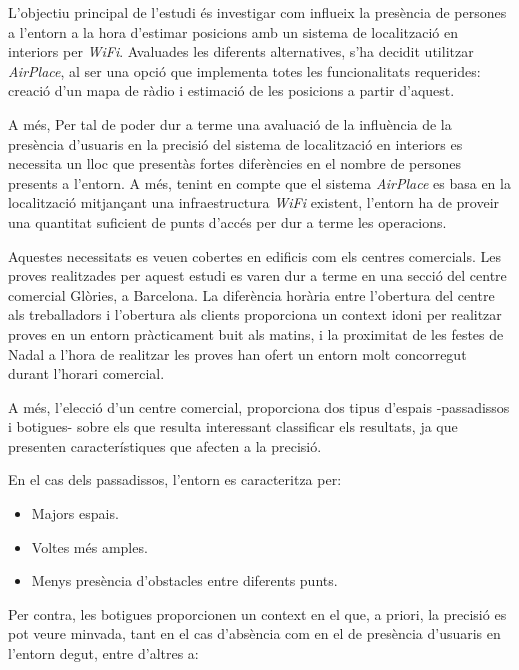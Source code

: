 
L'objectiu principal de l'estudi és investigar com influeix la presència de persones a l'entorn a la hora d'estimar posicions amb un sistema de localització en interiors per \textit{WiFi}. Avaluades les diferents alternatives, s'ha decidit utilitzar \textit{AirPlace}, al ser una opció que implementa totes les funcionalitats requerides: creació d'un mapa de ràdio i estimació de les posicions a partir d'aquest.

A més, Per tal de poder dur a terme una avaluació de la influència de la presència d'usuaris en la precisió del sistema de localització en interiors es necessita un lloc que presentàs fortes diferències en el nombre de persones presents a l'entorn. A més, tenint en compte que el sistema \textit{AirPlace} es basa en la localització mitjançant una infraestructura \textit{WiFi} existent, l'entorn ha de proveir una quantitat suficient de punts d'accés per dur a terme les operacions.

Aquestes necessitats es veuen cobertes en edificis com els centres comercials. Les proves realitzades per aquest estudi es varen dur a terme en una secció del centre comercial Glòries, a Barcelona. La diferència horària entre l'obertura del centre als treballadors i l'obertura als clients proporciona un context idoni per realitzar proves en un entorn pràcticament buit als matins, i la proximitat de les festes de Nadal a l'hora de realitzar les proves han ofert un entorn molt concorregut durant l'horari comercial.

A més, l'elecció d'un centre comercial, proporciona dos tipus d'espais -passadissos i botigues- sobre els que resulta interessant classificar els resultats, ja que presenten característiques que afecten a la precisió.

En el cas dels passadissos, l'entorn es caracteritza per:

\begin{itemize}
    \item Majors espais.
    \item Voltes més amples.
    \item Menys presència d'obstacles entre diferents punts.
\end{itemize}

Per contra, les botigues proporcionen un context en el que, a priori, la precisió es pot veure minvada, tant en el cas d'absència com en el de presència d'usuaris en l'entorn degut, entre d'altres a:

